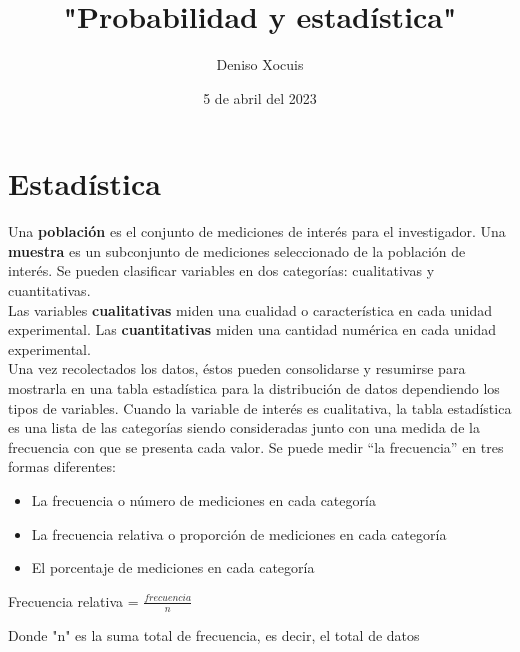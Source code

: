 \documentclass[letterpaper,12pt]{article}
\title {\textbf{"Probabilidad y estadística"}}
\author{Deniso Xocuis}
\date{5 de abril del 2023}
\begin{document}
\maketitle
\thispagestyle{empty}
\newpage
\setcounter{page}{1}
\pagestyle{headings}

\begin{sloppypar} 
\end{sloppypar}
\section*{Estadística}
Una \textbf{población} es el conjunto de mediciones de interés para el investigador. Una \textbf{muestra} es un subconjunto de mediciones seleccionado de la población de interés. 
Se pueden clasificar variables en dos categorías: cualitativas y cuantitativas.
\vspace{0.3cm}\\
Las variables \textbf{cualitativas} miden una cualidad o característica en cada unidad experimental. Las \textbf{cuantitativas} miden una cantidad numérica en cada unidad experimental.
\vspace{0.3cm}\\
Una vez recolectados los datos, éstos pueden consolidarse y resumirse para mostrarla en una tabla estadística para la distribución de datos dependiendo los tipos de variables. 
Cuando la variable de interés es cualitativa, la tabla estadística es una lista de las categorías siendo consideradas junto con una medida de la frecuencia con que se presenta cada valor. Se puede medir “la frecuencia” en tres formas diferentes:
\begin{itemize}
    \item La frecuencia o número de mediciones en cada categoría 
    \item La frecuencia relativa o proporción de mediciones en cada categoría 
    \item El porcentaje de mediciones en cada categoría 
\end{itemize}

\begin{center}
    Frecuencia relativa = $\displaystyle \frac{frecuencia}{n}$
\end{center}
Donde "n" es la suma total de frecuencia, es decir, el total de datos
\end{document}

